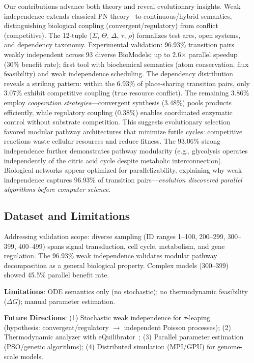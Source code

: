 \documentclass[twocolumn,11pt]{article}
\begin{document}
Our contributions advance both theory and reveal evolutionary insights. Weak independence extends classical PN theory~\cite{Reisig2013,Murata1989} to continuous/hybrid semantics, distinguishing biological coupling (convergent/regulatory) from conflict (competitive). The 12-tuple ($\Sigma$, $\Theta$, $\Delta$, $\tau$, $\rho$) formalizes test arcs, open systems, and dependency taxonomy. Experimental validation: 96.93\% transition pairs weakly independent across 93 diverse BioModels; up to 2.6$\times$ parallel speedup (30\% benefit rate); first tool with biochemical semantics (atom conservation, flux feasibility) and weak independence scheduling. The dependency distribution reveals a striking pattern: within the 6.93\% of place-sharing transition pairs, only 3.07\% exhibit competitive coupling (true resource conflict). The remaining 3.86\% employ \emph{cooperation strategies}---convergent synthesis (3.48\%) pools products efficiently, while regulatory coupling (0.38\%) enables coordinated enzymatic control without substrate competition. This suggests evolutionary selection favored modular pathway architectures that minimize futile cycles: competitive reactions waste cellular resources and reduce fitness. The 93.06\% strong independence further demonstrates pathway modularity (e.g., glycolysis operates independently of the citric acid cycle despite metabolic interconnection). Biological networks appear optimized for parallelizability, explaining why weak independence captures 96.93\% of transition pairs---\emph{evolution discovered parallel algorithms before computer science}.

\subsection{Dataset and Limitations}

Addressing validation scope: diverse sampling (ID ranges 1--100, 200--299, 300--399, 400--499) spans signal transduction, cell cycle, metabolism, and gene regulation. The 96.93\% weak independence validates modular pathway decomposition as a general biological property. Complex models (300--399) showed 45.5\% parallel benefit rate.

\textbf{Limitations}: ODE semantics only (no stochastic); no thermodynamic feasibility ($\Delta G$); manual parameter estimation.

\textbf{Future Directions}: (1) Stochastic weak independence for $\tau$-leaping~\cite{Gillespie2001} (hypothesis: convergent/regulatory $\to$ independent Poisson processes); (2) Thermodynamic analyzer with eQuilibrator~\cite{Flamholz2012}; (3) Parallel parameter estimation (PSO/genetic algorithms); (4) Distributed simulation (MPI/GPU) for genome-scale models.
\end{document}
